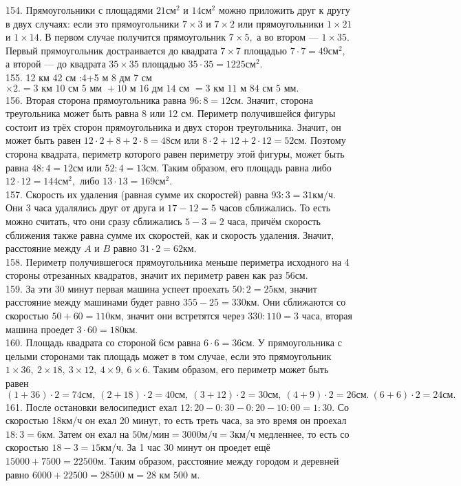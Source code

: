 154. Прямоугольники с площадями $21\text{см}^2$ и $14\text{см}^2$ можно приложить друг к другу в двух случаях: если это прямоугольники $7\times3$ и $7\times2$ или прямоугольники $1\times21$ и $1\times14.$ В первом случае получится прямоугольник $7\times5,$ а во втором --- $1\times35.$ Первый прямоугольник достраивается до квадрата $7\times7$ площадью $7\cdot7=49\text{см}^2,$ а второй --- до квадрата $35\times35$ площадью $35\cdot35=1225\text{см}^2.$\\
155. 12 км 42 см :4+5 м 8 дм 7 см$\times2.=3\text{ км }10\text{ см }5\text{ мм }+10\text{ м }16\text{ дм }14\text{ см }=3\text{ км }11\text{ м }84\text{ см }5\text{ мм.}$\\
156. Вторая сторона прямоугольника равна $96:8=12$см. Значит, сторона треугольника может быть равна 8 или 12 см. Периметр получившейся фигуры состоит из трёх сторон прямоугольника и двух сторон треугольника. Значит, он может быть равен $12\cdot2+8+2\cdot8=48$см или $8\cdot2+12+2\cdot12=52$см. Поэтому сторона квадрата, периметр которого равен периметру этой фигуры, может быть равна $48:4=12$см или $52:4=13$см. Таким образом, его площадь равна либо $12\cdot12=144\text{см}^2,$ либо $13\cdot13=169\text{см}^2.$\\
157. Скорость их удаления (равная сумме их скоростей) равна $93:3=31$км/ч. Они 3 часа удалялись друг от друга и $17-12=5$ часов сближались. То есть можно считать, что они сразу сближались $5-3=2$ часа, причём скорость сближения также равна сумме их скоростей, как и скорость удаления. Значит, расстояние между  $A$ и $B$ равно $31\cdot2=62$км.\\
158. Периметр получившегося прямоугольника меньше периметра исходного на 4 стороны отрезанных квадратов, значит их периметр равен как раз 56см.\\
159. За эти 30 минут первая машина успеет проехать $50:2=25$км, значит расстояние между машинами будет равно $355-25=330$км. Они сближаются со скоростью $50+60=110$км, значит они встретятся через $330:110=3$ часа, вторая машина проедет $3\cdot60=180$км.\\
160. Площадь квадрата со стороной 6см равна $6\cdot6=36$см. У прямоугольника с целыми сторонами так площадь может в том случае, если это прямоугольник $1\times36,\ 2\times18,\ 3\times12,\ 4\times9,\ 6\times6.$ Таким образом, его периметр может быть равен $(1+36)\cdot2=74\text{см},\ (2+18)\cdot2=40\text{см},\ (3+12)\cdot2=30\text{см},\ (4+9)\cdot2=26\text{см}.\ (6+6)\cdot2=24\text{см}.$\\
161. После остановки велосипедист ехал $12:20-0:30-0:20-10:00=1:30.$ Со скоростью 18км/ч он ехал 20 минут, то есть треть часа, за это время он проехал $18:3=6$км. Затем он ехал на $50\text{м/мин}=3000\text{м/ч}=3$км/ч медленнее, то есть со скоростью $18-3=15$км/ч. За 1 час 30 минут он проедет ещё $15000+7500=22500$м. Таким образом, расстояние между городом и деревней равно $6000+22500=28500\text{ м}=28\text{ км }500\text{ м.}$\\
